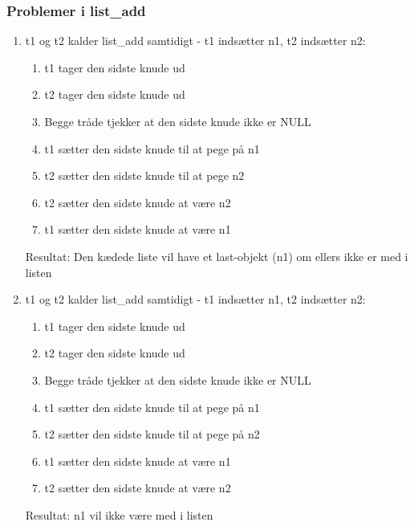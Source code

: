 \subsubsection*{Problemer i list\_add}
\begin{enumerate}
\item t1 og t2 kalder list\_add samtidigt - t1 indsætter n1, t2 indsætter n2:
	\begin{enumerate}
		\item t1 tager den sidste knude ud
		\item t2 tager den sidste knude ud
		\item Begge tråde tjekker at den sidste knude ikke er NULL
		\item t1 sætter den sidste knude til at pege på n1
		\item t2 sætter den sidste knude til at pege n2
		\item t2 sætter den sidste knude at være n2
		\item t1 sætter den sidste knude at være n1
	\end{enumerate}

Resultat: Den kædede liste vil have et last-objekt (n1) om ellers ikke er med i listen

\item t1 og t2 kalder list\_add samtidigt - t1 indsætter n1, t2 indsætter n2:
	\begin{enumerate}
		\item t1 tager den sidste knude ud
		\item t2 tager den sidste knude ud
		\item Begge tråde tjekker at den sidste knude ikke er NULL
		\item t1 sætter den sidste knude til at pege på n1
		\item t2 sætter den sidste knude til at pege på n2
		\item t1 sætter den sidste knude at være n1
		\item t2 sætter den sidste knude at være n2
	\end{enumerate}
Resultat: n1 vil ikke være med i listen
\end{enumerate}


